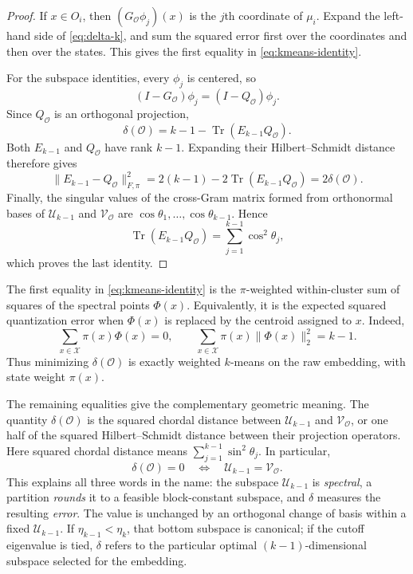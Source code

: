 \documentclass[11pt]{article}
\newcommand{\1}{\mathbf{1}}
\newcommand{\X}{\mathcal{X}}
\begin{document}
\begin{proof}
If $x\in O_i$, then $(G_{\mathcal O}\phi_j)(x)$ is the $j$th
coordinate of $\mu_i$.  Expand the left-hand side of
\eqref{eq:delta-k}, and sum the squared error first over the
coordinates and then over the states.  This gives
the first equality in \eqref{eq:kmeans-identity}.

For the subspace identities, every $\phi_j$ is centered, so
\[
    (I-G_{\mathcal O})\phi_j
    =(I-Q_{\mathcal O})\phi_j.
\]
Since $Q_{\mathcal O}$ is an orthogonal projection,
\[
    \delta(\mathcal O)
    =k-1-\operatorname{Tr}(E_{k-1}Q_{\mathcal O}).
\]
Both $E_{k-1}$ and $Q_{\mathcal O}$ have rank $k-1$.  Expanding their
Hilbert--Schmidt distance therefore gives
\[
    \|E_{k-1}-Q_{\mathcal O}\|_{F,\pi}^2
    =2(k-1)-2\operatorname{Tr}(E_{k-1}Q_{\mathcal O})
    =2\delta(\mathcal O).
\]
Finally, the singular values of the cross-Gram matrix formed from
orthonormal bases of $\mathcal U_{k-1}$ and $\mathcal V_{\mathcal O}$ are
$\cos\theta_1,\ldots,\cos\theta_{k-1}$.  Hence
\[
    \operatorname{Tr}(E_{k-1}Q_{\mathcal O})
    =\sum_{j=1}^{k-1}\cos^2\theta_j,
\]
which proves the last identity.
\end{proof}

The first equality in \eqref{eq:kmeans-identity} is the
$\pi$-weighted within-cluster sum of squares of the spectral points
$\Phi(x)$.  Equivalently, it is the expected squared quantization
error when $\Phi(x)$ is replaced by the centroid assigned to $x$.
Indeed,
\[
    \sum_{x\in\X}\pi(x)\Phi(x)=0,
    \qquad
    \sum_{x\in\X}\pi(x)\|\Phi(x)\|_2^2=k-1.
\]
Thus minimizing $\delta(\mathcal O)$ is exactly weighted $k$-means on
the raw embedding, with state weight $\pi(x)$.

The remaining equalities give the complementary geometric meaning.
The quantity $\delta(\mathcal O)$ is the squared chordal distance
between $\mathcal U_{k-1}$ and $\mathcal V_{\mathcal O}$, or one half of
the squared Hilbert--Schmidt distance between their projection
operators.  Here squared chordal distance means
$\sum_{j=1}^{k-1}\sin^2\theta_j$.  In particular,
\[
    \delta(\mathcal O)=0
    \quad\Longleftrightarrow\quad
    \mathcal U_{k-1}=\mathcal V_{\mathcal O}.
\]
This explains all three words in the name: the subspace
$\mathcal U_{k-1}$ is \emph{spectral}, a partition \emph{rounds} it to a
feasible block-constant subspace, and $\delta$ measures the resulting
\emph{error}.  The value is unchanged by an orthogonal change of
basis within a fixed $\mathcal U_{k-1}$.  If
$\eta_{k-1}<\eta_{k}$, that bottom subspace is canonical; if the cutoff
eigenvalue is tied, $\delta$ refers to the particular optimal
$(k-1)$-dimensional subspace selected for the embedding.
\end{document}
